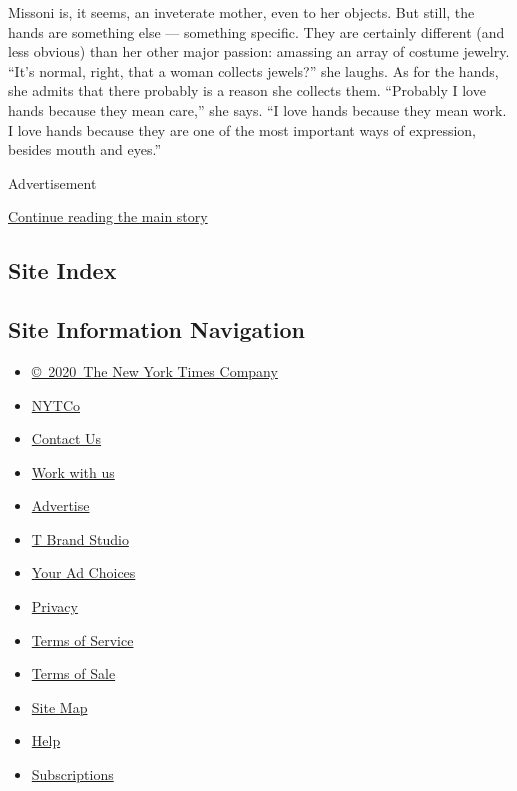 Missoni is, it seems, an inveterate mother, even to her objects. But
still, the hands are something else --- something specific. They are
certainly different (and less obvious) than her other major passion:
amassing an array of costume jewelry. ``It's normal, right, that a woman
collects jewels?'' she laughs. As for the hands, she admits that there
probably is a reason she collects them. ``Probably I love hands because
they mean care,'' she says. ``I love hands because they mean work. I
love hands because they are one of the most important ways of
expression, besides mouth and eyes.''

Advertisement

\protect\hyperlink{after-bottom}{Continue reading the main story}

\hypertarget{site-index}{%
\subsection{Site Index}\label{site-index}}

\hypertarget{site-information-navigation}{%
\subsection{Site Information
Navigation}\label{site-information-navigation}}

\begin{itemize}
\tightlist
\item
  \href{https://help.nytimes.com/hc/en-us/articles/115014792127-Copyright-notice}{©~2020~The
  New York Times Company}
\end{itemize}

\begin{itemize}
\tightlist
\item
  \href{https://www.nytco.com/}{NYTCo}
\item
  \href{https://help.nytimes.com/hc/en-us/articles/115015385887-Contact-Us}{Contact
  Us}
\item
  \href{https://www.nytco.com/careers/}{Work with us}
\item
  \href{https://nytmediakit.com/}{Advertise}
\item
  \href{http://www.tbrandstudio.com/}{T Brand Studio}
\item
  \href{https://www.nytimes.com/privacy/cookie-policy\#how-do-i-manage-trackers}{Your
  Ad Choices}
\item
  \href{https://www.nytimes.com/privacy}{Privacy}
\item
  \href{https://help.nytimes.com/hc/en-us/articles/115014893428-Terms-of-service}{Terms
  of Service}
\item
  \href{https://help.nytimes.com/hc/en-us/articles/115014893968-Terms-of-sale}{Terms
  of Sale}
\item
  \href{https://spiderbites.nytimes.com}{Site Map}
\item
  \href{https://help.nytimes.com/hc/en-us}{Help}
\item
  \href{https://www.nytimes.com/subscription?campaignId=37WXW}{Subscriptions}
\end{itemize}
